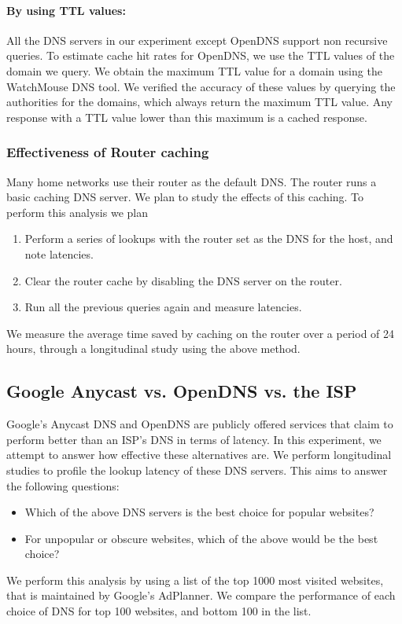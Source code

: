 \documentclass[twocolumn]{article}
\begin{document}
\paragraph{By using TTL values:} All the DNS servers in our experiment except OpenDNS support non recursive queries. To estimate cache hit rates for OpenDNS, we use the TTL values of the domain we query. We obtain the maximum TTL value for a domain using the WatchMouse DNS tool\cite{website:Watchmouse:2011:Online}. We verified the accuracy of these values by querying the authorities for the domains, which always return the maximum TTL value. Any response with a TTL value lower than this maximum is a cached response.
\subsubsection{Effectiveness of Router caching}
Many home networks use their router as the default DNS. The router runs a basic caching DNS server. We plan to study the effects of this caching.
To perform this analysis we plan
\begin{enumerate}
\item Perform a series of lookups with the router set as the DNS for the host, and note latencies.
\item Clear the router cache by disabling the DNS server on the router.
\item Run all the previous queries again and measure latencies.
\end{enumerate}
We measure the average time saved by caching on the router over a period of 24 hours, through a longitudinal study using the above method.
\subsection{Google Anycast vs. OpenDNS vs. the ISP}
Google's Anycast DNS and OpenDNS are publicly offered services that claim to perform better than an ISP's DNS in terms of latency. In this experiment, we attempt to answer how effective these alternatives are.
We perform longitudinal studies to profile the lookup latency of these DNS servers. This aims to answer the following questions:
\begin{itemize}
\item Which of the above DNS servers is the best choice for popular websites?
\item For unpopular or obscure websites, which of the above would be the best choice?
\end{itemize}
We perform this analysis by using a list of the top 1000 most visited websites, that is maintained by Google’s AdPlanner. We compare the performance of each choice of DNS for top 100 websites, and bottom 100 in the list.
\end{document}
